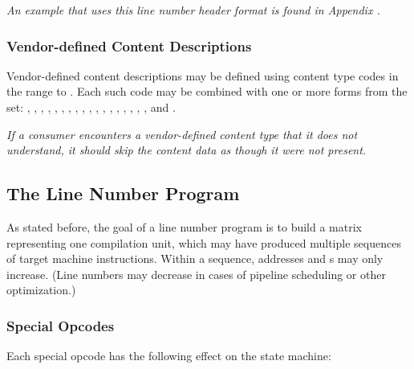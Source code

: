 \textit{An example that uses this line number header format
is found in Appendix .}

\subsubsection{Vendor-defined Content Descriptions}
\label{chap:vendordefinedcontentdescriptions}
Vendor-defined content descriptions may be defined using content
type codes in the range \DWLNCTlouserNAME{} to \DWLNCThiuserNAME{}. Each
such code may be combined with one or more forms from the set:
\DWFORMblock, \DWFORMblockone, \DWFORMblocktwo, \DWFORMblockfour,
\DWFORMdataone, \DWFORMdatatwo, \DWFORMdatafour, \DWFORMdataeight,
\DWFORMdatasixteen,
\DWFORMflag, \DWFORMlinestrp, \DWFORMsdata, \DWFORMsecoffset,
\DWFORMstring, \DWFORMstrp, 
\bb
\DWFORMstrpeight,
\DWFORMstrpsup, 
\DWFORMstrpsupeight,
\eb
\DWFORMstrxXN{} and \DWFORMudata.

\textit{If a consumer encounters a vendor-defined content type that
it does not understand, it should skip the content data as though
it were not present.}

\subsection{The Line Number Program}
\label{chap:linenumberprogram}
As stated before, the goal of a line number program is to build
a matrix representing one compilation unit, which may have
produced multiple sequences of target machine instructions.
Within a sequence, addresses and 
s may only increase. 
(Line numbers may decrease in cases of pipeline
scheduling or other optimization.)

\subsubsection{Special Opcodes} 
\label{chap:specialopcodes}
Each \HFTubyte{} special opcode has the following effect on the state machine:

